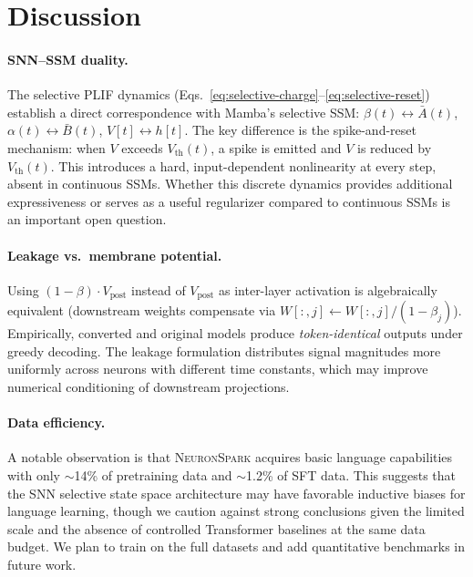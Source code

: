 \documentclass[10pt,twocolumn]{article}
\newcommand{\model}{\textsc{NeuronSpark}}
\newcommand{\vpost}{V_{\text{post}}}
\newcommand{\vth}{V_{\text{th}}}
\begin{document}
\section{Discussion}
\label{sec:discussion}

\paragraph{SNN--SSM duality.}
The selective PLIF dynamics (Eqs.~\ref{eq:selective-charge}--\ref{eq:selective-reset}) establish a direct correspondence with Mamba's selective SSM:
$\beta(t) \leftrightarrow \bar{A}(t)$, $\alpha(t) \leftrightarrow \bar{B}(t)$, $V[t] \leftrightarrow h[t]$.
The key difference is the spike-and-reset mechanism: when $V$ exceeds $\vth(t)$, a spike is emitted and $V$ is reduced by $\vth(t)$.
This introduces a hard, input-dependent nonlinearity at every step, absent in continuous SSMs.
Whether this discrete dynamics provides additional expressiveness or serves as a useful regularizer compared to continuous SSMs is an important open question.

\paragraph{Leakage vs.\ membrane potential.}
Using $(1-\beta) \cdot \vpost$ instead of $\vpost$ as inter-layer activation is algebraically equivalent (downstream weights compensate via $W[:, j] \leftarrow W[:, j] / (1-\beta_j)$).
Empirically, converted and original models produce \emph{token-identical} outputs under greedy decoding.
The leakage formulation distributes signal magnitudes more uniformly across neurons with different time constants, which may improve numerical conditioning of downstream projections.

\paragraph{Data efficiency.}
A notable observation is that \model{} acquires basic language capabilities with only $\sim$14\% of pretraining data and $\sim$1.2\% of SFT data.
This suggests that the SNN selective state space architecture may have favorable inductive biases for language learning, though we caution against strong conclusions given the limited scale and the absence of controlled Transformer baselines at the same data budget.
We plan to train on the full datasets and add quantitative benchmarks in future work.
\end{document}
